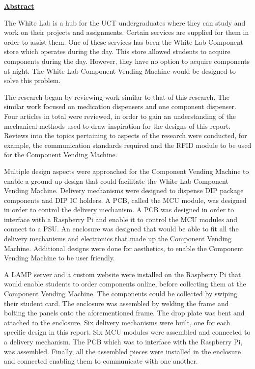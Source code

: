 \documentclass[a4paper,11pt]{article}
\numberwithin{figure}{section}
\numberwithin{table}{section}
\begin{document}
	{\centering\Huge\bfseries\underline{Abstract}\par}

The White Lab is a hub for the UCT undergraduates where they can study and work on their projects and assignments. Certain services are supplied for them in order to assist them. One of these services has been the White Lab Component store which operates during the day. This store allowed students to acquire components during the day. However, they have no option to acquire components at night. The White Lab Component Vending Machine would be designed to solve this problem.

The research began by reviewing work similar to that of this research. The similar work focused on medication dispensers and one component dispenser. Four articles in total were reviewed, in order to gain an understanding of the mechanical methods used to draw inspiration for the designs of this report. Reviews into the topics pertaining to aspects of the research were conducted, for example, the communication standards required and the RFID module to be used for the Component Vending Machine.

Multiple design aspects were approached for the Component Vending Machine to enable a ground up design that could facilitate the White Lab Component Vending Machine. Delivery mechanisms were designed to dispense DIP package components and DIP IC holders. A PCB, called the MCU module, was designed in order to control the delivery mechanism. A PCB was designed in order to interface with a Raspberry Pi and enable it to control the MCU modules and connect to a PSU. An enclosure was designed that would be able to fit all the delivery mechanisms and electronics that made up the Component Vending Machine. Additional designs were done for aesthetics, to enable the Component Vending Machine to be user friendly.

A LAMP server and a custom website were installed on the Raspberry Pi that would enable students to order components online, before collecting them at the Component Vending Machine. The components could be collected by swiping their student card. The enclosure was assembled by welding the frame and bolting the panels onto the aforementioned frame. The drop plate was bent and attached to the enclosure. Six delivery mechanisms were built, one for each specific design in this report. Six MCU modules were assembled and connected to a delivery mechanism. The PCB which was to interface with the Raspberry Pi, was assembled. Finally, all the assembled pieces were installed in the enclosure and connected enabling them to communicate with one another.
\end{document}

